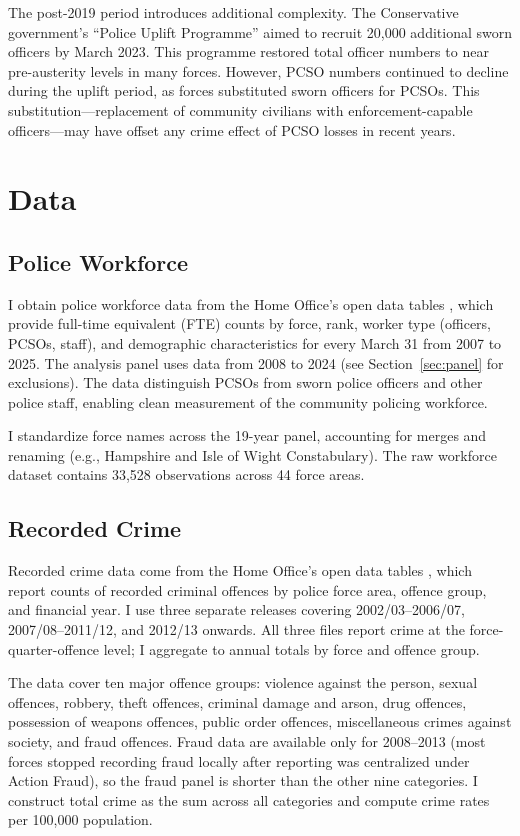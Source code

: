 \documentclass[12pt]{article}
\begin{document}
The post-2019 period introduces additional complexity. The Conservative government's ``Police Uplift Programme'' aimed to recruit 20,000 additional sworn officers by March 2023. This programme restored total officer numbers to near pre-austerity levels in many forces. However, PCSO numbers continued to decline during the uplift period, as forces substituted sworn officers for PCSOs. This substitution---replacement of community civilians with enforcement-capable officers---may have offset any crime effect of PCSO losses in recent years.


\section{Data}

\subsection{Police Workforce}

I obtain police workforce data from the Home Office's open data tables \citep{homeoffice2010workforce}, which provide full-time equivalent (FTE) counts by force, rank, worker type (officers, PCSOs, staff), and demographic characteristics for every March 31 from 2007 to 2025. The analysis panel uses data from 2008 to 2024 (see Section~\ref{sec:panel} for exclusions). The data distinguish PCSOs from sworn police officers and other police staff, enabling clean measurement of the community policing workforce.

I standardize force names across the 19-year panel, accounting for merges and renaming (e.g., Hampshire and Isle of Wight Constabulary). The raw workforce dataset contains 33,528 observations across 44 force areas.

\subsection{Recorded Crime}

Recorded crime data come from the Home Office's open data tables \citep{homeoffice2025crime}, which report counts of recorded criminal offences by police force area, offence group, and financial year. I use three separate releases covering 2002/03--2006/07, 2007/08--2011/12, and 2012/13 onwards. All three files report crime at the force-quarter-offence level; I aggregate to annual totals by force and offence group.

The data cover ten major offence groups: violence against the person, sexual offences, robbery, theft offences, criminal damage and arson, drug offences, possession of weapons offences, public order offences, miscellaneous crimes against society, and fraud offences. Fraud data are available only for 2008--2013 (most forces stopped recording fraud locally after reporting was centralized under Action Fraud), so the fraud panel is shorter than the other nine categories. I construct total crime as the sum across all categories and compute crime rates per 100,000 population.
\end{document}

